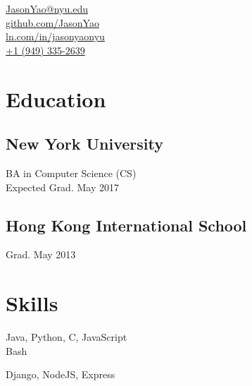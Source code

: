 \documentclass[]{hieudo-build}
\begin{document}
%
%
{
	\faEnvelope  \href{mailto:JasonYao@nyu.edu}{JasonYao@nyu.edu}\\
	\faGithub  \href{https://github.com/JasonYao}{github.com/JasonYao}\\
	\faLinkedinSquare   \href{https://www.linkedin.com/in/jasonyaonyu/}{ln.com/in/jasonyaonyu}\\
    \faPhone \href{tel:19493352639}{+1 (949) 335-2639}
}
    
%
%
\begin{minipage}[t]{0.34\textwidth} 

\section{Education} 

\subsection{New York University}
BA in Computer Science (CS) \\
Expected Grad. May 2017 \\
\sectionsep

\subsection{Hong Kong International School}
Grad. May 2013 \\
\sectionsep

\section{Skills}
Java, Python, C, JavaScript\\
Bash
\newline

Django, NodeJS, Express
\newline



\end{minipage}
\end{document}

